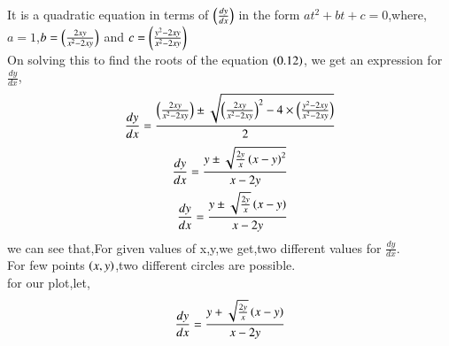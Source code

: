 \documentclass[journal]{IEEEtran}
\begin{document}
It is a quadratic equation in terms of $\left(\frac{dy}{dx}\right)$ in the form $at^2 + bt + c=0$,where, \\$a = 1$,$b =  \left(\frac{2xy}{x^2 - 2xy}\right)$ and $c = \left(\frac{y^2 - 2xy}{x^2 - 2xy}\right)$\\
On solving this to find the roots of the equation $\left(0.12\right)$, we get an expression for $\frac{dy}{dx}$,
\begin{align}
    \frac{dy}{dx} = \frac{\left(\frac{2xy}{x^2 - 2xy}\right) \pm \sqrt{\left(\frac{2xy}{x^2 - 2xy}\right)^2 - 4\times\left(\frac{y^2 - 2xy}{x^2 - 2xy}\right)}}{2}
\end{align}
\begin{align}
    \frac{dy}{dx} = \frac{y \pm \sqrt{\frac{2y}{x}\left(x - y\right)^2}}{x - 2y} \\
    \frac{dy}{dx} = \frac{y \pm \sqrt{\frac{2y}{x}}\left(x - y\right)}{x - 2y}
\end{align}
 we can see that,For given values of x,y,we get,two different values for $\frac{dy}{dx}$.\\
 For few points $\left(x,y\right)$,two different circles are possible.\\
 for our plot,let, 
 \begin{align}
     \frac{dy}{dx} = \frac{y + \sqrt{\frac{2y}{x}}\left(x - y\right)}{x - 2y}
 \end{align}
 
\end{document}
